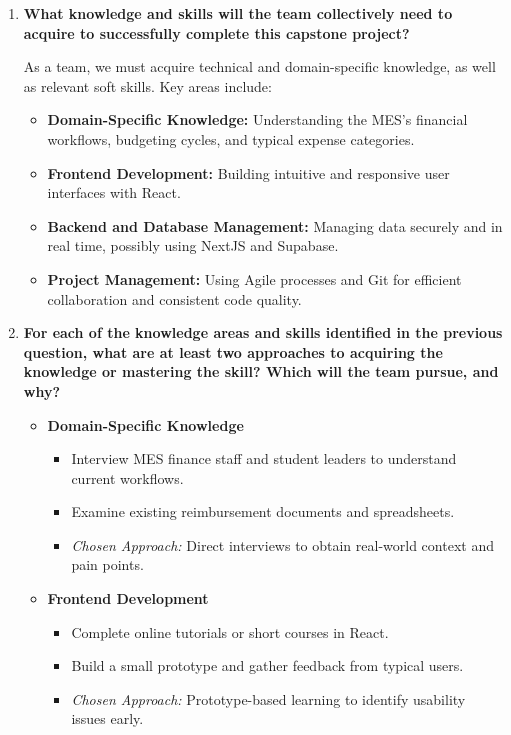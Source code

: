 \documentclass[12pt]{article}
\begin{document}
\begin{enumerate}
  \item \textbf{What knowledge and skills will the team collectively need to acquire to
  successfully complete this capstone project?}

  As a team, we must acquire technical and domain-specific knowledge, as well as relevant soft skills. Key areas include:
  \begin{itemize}
    \item \textbf{Domain-Specific Knowledge:} Understanding the MES’s financial workflows, budgeting cycles, and typical expense categories.
    \item \textbf{Frontend Development:} Building intuitive and responsive user interfaces with React.
    \item \textbf{Backend and Database Management:} Managing data securely and in real time, possibly using NextJS and Supabase.
    \item \textbf{Project Management:} Using Agile processes and Git for efficient collaboration and consistent code quality.
  \end{itemize}

  \item \textbf{For each of the knowledge areas and skills identified in the previous
  question, what are at least two approaches to acquiring the knowledge or mastering the skill? Which will the team pursue, and why?}

  \begin{itemize}
    \item \textbf{Domain-Specific Knowledge}
    \begin{itemize}
      \item Interview MES finance staff and student leaders to understand current workflows.
      \item Examine existing reimbursement documents and spreadsheets.
      \item \textit{Chosen Approach:} Direct interviews to obtain real-world context and pain points.
    \end{itemize}

    \item \textbf{Frontend Development}
    \begin{itemize}
      \item Complete online tutorials or short courses in React.
      \item Build a small prototype and gather feedback from typical users.
      \item \textit{Chosen Approach:} Prototype-based learning to identify usability issues early.
    \end{itemize}


\end{itemize}
\end{enumerate}
\end{document}
